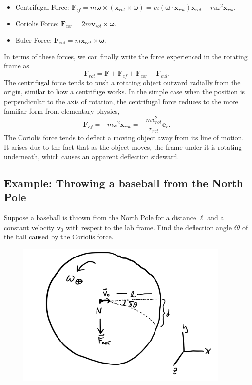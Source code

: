 \documentclass[
  letterpaper,
  DIV=11,
  numbers=noendperiod]{scrreprt}
\providecommand{\tightlist}{%
  \setlength{\itemsep}{0pt}\setlength{\parskip}{0pt}}\usepackage{longtable,booktabs,array}
\begin{document}
\begin{itemize}
\tightlist
\item
  Centrifugal Force:
  \(\mathbf{F}_{cf} = m \boldsymbol{\omega} \times (\mathbf{x}_{rot} \times \boldsymbol{\omega}) = m(\boldsymbol{\omega} \cdot \mathbf{x}_{rot})\mathbf{x}_{rot} - m\omega^2 \mathbf{x}_{rot}\).
\item
  Coriolis Force:
  \(\mathbf{F}_{cor} = 2m \mathbf{v}_{rot} \times \boldsymbol{\omega}\).
\item
  Euler Force:
  \(\mathbf{F}_{eul} = m \mathbf{x}_{rot} \times \boldsymbol{\dot \omega}\).
\end{itemize}

In terms of these forces, we can finally write the force experienced in
the rotating frame as \[
\mathbf{F}_{rot} = \mathbf{F} + \mathbf{F}_{cf} + \mathbf{F}_{cor} + \mathbf{F}_{eul}.
\] The centrifugal force tends to push a rotating object outward
radially from the origin, similar to how a centrifuge works. In the
simple case when the position is perpendicular to the axis of rotation,
the centrifugal force reduces to the more familiar form from elementary
physics, \[
\mathbf{F}_{cf} = - m\omega^2 \mathbf{x}_{rot} = -\frac{mv_{rot}^2}{r_{rot}} \mathbf{e}_r.
\] The Coriolis force tends to deflect a moving object away from its
line of motion. It arises due to the fact that as the object moves, the
frame under it is rotating underneath, which causes an apparent
deflection sideward.

\hypertarget{example-throwing-a-baseball-from-the-north-pole}{%
\subsection{Example: Throwing a baseball from the North
Pole}\label{example-throwing-a-baseball-from-the-north-pole}}

Suppose a baseball is thrown from the North Pole for a distance \(\ell\)
and a constant velocity \(\mathbf{v}_0\) with respect to the lab frame.
Find the deflection angle \(\delta\theta\) of the ball caused by the
Coriolis force.

\begin{figure}

{\centering \includegraphics[width=4.16667in,height=\textheight]{classical-mechanics/./resources/image-20230217134747801.png}

}

\end{figure}
\end{document}
